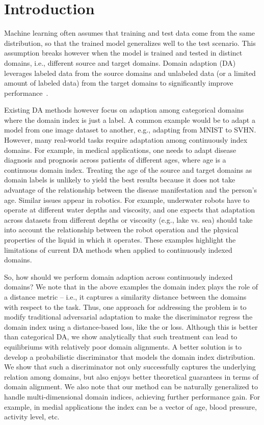 \documentclass{article}
\begin{document}
 \section{Introduction}
Machine learning often assumes that training and test data come from the same distribution, so that the trained model generalizes well to the test scenario. This assumption breaks however when the model is trained and tested in distinct domains, i.e., different source and target domains.  Domain adaption (DA) leverages labeled data from the source domains and unlabeled data (or a limited amount of labeled data) from the target domains to significantly improve performance~\cite{bendavid,DANN,ADDA,MDD}.

Existing DA methods however focus on adaption among categorical domains where the domain index is just a label.  A common example would be to adapt a model from one image dataset to another, e.g., adapting from MNIST to SVHN. However, many real-world tasks require adaptation among continuously index domains. For example, in medical applications, one needs to adapt disease diagnosis and prognosis across patients of different ages, where age is a continuous domain index. Treating the age of the source and target domains as domain labels is unlikely to yield the best results because it does not take advantage of the relationship between the disease manifestation and the person's age. Similar issues appear in robotics. For example, underwater robots have to operate at different water depths and viscosity, and one expects that adaptation across datasets from different depths or viscosity (e.g., lake vs. sea) should take into account  the relationship between the robot operation and the physical properties of the liquid in which it operates. These examples highlight the limitations of current DA methods when applied to continuously indexed domains.  

So, how should we perform domain adaption across continuously indexed domains? We note that in the above examples the domain index plays the role of a distance metric -- i.e., it captures a similarity distance between the domains with respect to the task. Thus, one approach for addressing the problem is to modify traditional adversarial adaptation to make the discriminator regress the domain index using a distance-based loss, like the  or  loss. Although this is better than categorical DA, we show analytically that such treatment can lead to equilibriums with relatively poor domain alignments.  A better solution is to develop a probabilistic discriminator that models the domain index distribution. We show that such a discriminator not only successfully captures the underlying relation among domains, but also enjoys better theoretical guarantees in terms of domain alignment. 
We also note that our method can be naturally generalized to handle multi-dimensional domain indices, achieving further performance gain. For example, in medial applications the index can be a vector of age, blood pressure, activity level, etc. 
\end{document}
